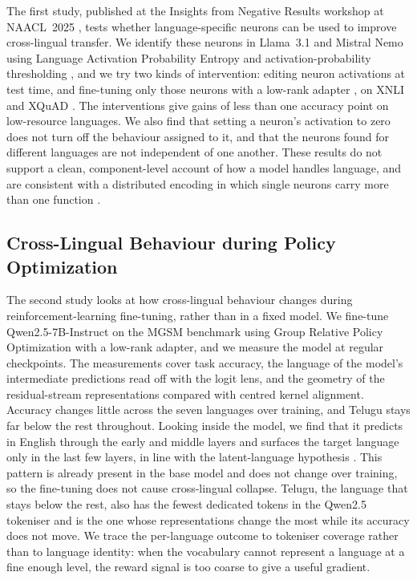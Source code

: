 The first study, published at the Insights from Negative Results workshop at
NAACL~2025 \citep{mondal2025language}, tests whether language-specific neurons can
be used to improve cross-lingual transfer. We identify these neurons in Llama~3.1
and Mistral Nemo using Language Activation Probability Entropy and
activation-probability thresholding \citep{tang2024language}, and we try two kinds
of intervention: editing neuron activations at test time, and fine-tuning only
those neurons with a low-rank adapter \citep{hu2022lora}, on XNLI
\citep{conneau2018xnli} and XQuAD \citep{artetxe2020cross}. The interventions give
gains of less than one accuracy point on low-resource languages. We also find that
setting a neuron's activation to zero does not turn off the behaviour assigned to
it, and that the neurons found for different languages are not independent of one
another. These results do not support a clean, component-level account of how a
model handles language, and are consistent with a distributed encoding in which
single neurons carry more than one function \citep{elhage2022superposition}.

\subsection{Cross-Lingual Behaviour during Policy Optimization}
\label{sec:intro-grpo}

The second study looks at how cross-lingual behaviour changes during
reinforcement-learning fine-tuning, rather than in a fixed model. We fine-tune
Qwen2.5-7B-Instruct on the MGSM benchmark \citep{shi2022mgsm} using Group Relative
Policy Optimization \citep{shao2024deepseekmath} with a low-rank adapter, and we
measure the model at regular checkpoints. The measurements cover task accuracy,
the language of the model's intermediate predictions read off with the logit lens,
and the geometry of the residual-stream representations compared with centred
kernel alignment. Accuracy changes little across the seven languages over
training, and Telugu stays far below the rest throughout. Looking inside the
model, we find that it predicts in English through the early and middle layers and
surfaces the target language only in the last few layers, in line with the
latent-language hypothesis \citep{wendler2024llamas}. This pattern is already
present in the base model and does not change over training, so the fine-tuning
does not cause cross-lingual collapse. Telugu, the language that stays below the
rest, also has the fewest dedicated tokens in the Qwen2.5 tokeniser and is the one
whose representations change the most while its accuracy does not move. We trace
the per-language outcome to tokeniser coverage rather than to language identity:
when the vocabulary cannot represent a language at a fine enough level, the reward
signal is too coarse to give a useful gradient.

